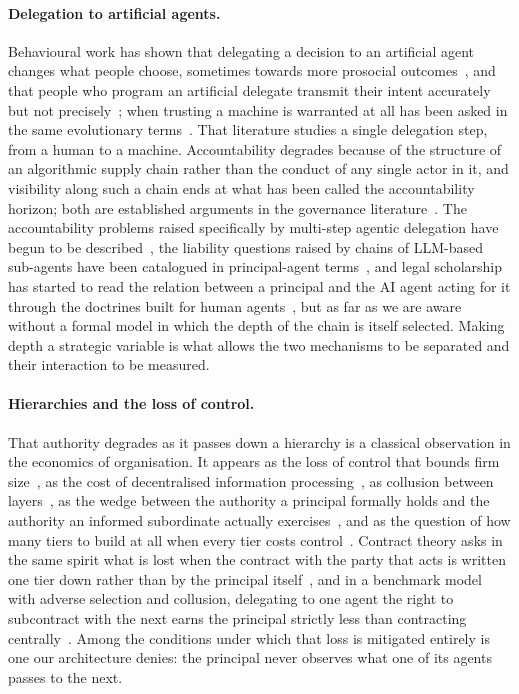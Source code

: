 \documentclass[11pt,a4paper]{article}
\theoremstyle{definition}
\begin{document}
\paragraph{Delegation to artificial agents.}
Behavioural work has shown that delegating a decision to an artificial agent
changes what people choose, sometimes towards more prosocial
outcomes~\citep{domingos2022delegation}, and that people who program an
artificial delegate transmit their intent accurately but not
precisely~\citep{terrucha2025delegates}; when trusting a machine is warranted
at all has been asked in the same evolutionary
terms~\citep{han2021trustmachines}. That literature studies a single
delegation step, from a human to a machine. Accountability degrades because of
the structure of an algorithmic supply chain rather than the conduct of any
single actor in it, and visibility along such a chain ends at what has been
called the accountability horizon; both are established arguments in the
governance literature~\citep{cobbe2023supply}. The accountability problems raised
specifically by multi-step agentic delegation have begun to be
described~\citep{hammond2025multiagent,raji2026governance,tomasev2026delegation},
the liability questions raised by chains of LLM-based sub-agents have been
catalogued in principal-agent terms~\citep{gabison2025liability},
and legal scholarship has started to read the relation between a principal and
the AI agent acting for it through the doctrines built for human
agents~\citep{kolt2025governing,okeefe2025lawfollowing}, but as far as we are
aware without a formal model in which the depth of the chain is itself
selected. Making depth a strategic variable is what allows the
two mechanisms to be separated and their interaction to be measured.

\paragraph{Hierarchies and the loss of control.}
That authority degrades as it passes down a hierarchy is a classical
observation in the economics of organisation. It appears as the loss of control
that bounds firm size~\citep{williamson1967hierarchical,calvo1978supervision},
as the cost of
decentralised information processing~\citep{radner1993organization}, as
collusion between layers~\citep{tirole1986hierarchies}, as the wedge
between the authority a principal formally holds and the authority an informed
subordinate actually exercises~\citep{aghion1997authority}, and as the question
of how many tiers to build at all when every tier costs
control~\citep{qian1994incentives,garicano2000hierarchies,mcafee1995diseconomies}.
Contract theory
asks in the same spirit what is lost when the contract with the party that acts
is written one tier down rather than by the principal
itself~\citep{melumad1995hierarchical,mookherjee2006decentralization}, and in a
benchmark model with adverse selection and collusion, delegating to one agent
the right to subcontract with the next earns the principal strictly less than
contracting centrally~\citep{mookherjee2004supplier}. Among the conditions
under which that loss is mitigated entirely is one our architecture denies: the
principal never observes what one of its agents passes to the next.
\end{document}
